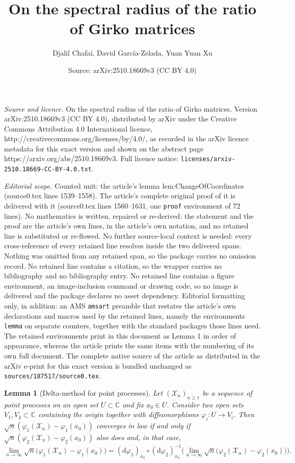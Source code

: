 \documentclass[10pt,a4paper]{amsart}
\title{On the spectral radius of the ratio of Girko matrices}
\author{Djalil Chafaï, David García-Zelada, Yuan Yuan Xu}
\date{Source: arXiv:2510.18669v3 (CC BY 4.0)}
\newtheorem{lemma}{Lemma}
\begin{document}
\maketitle

\noindent\emph{Source and licence.} On the spectral radius of the ratio of Girko matrices. Version arXiv:2510.18669v3 (CC BY 4.0), distributed by arXiv under the Creative Commons Attribution 4.0 International licence, http://creativecommons.org/licenses/by/4.0/, as recorded in the arXiv licence metadata for this exact version and shown on the abstract page https://arxiv.org/abs/2510.18669v3. Full licence notice: \texttt{licenses/arxiv-2510.18669-CC-BY-4.0.txt}.\par\smallskip

\noindent\textit{Editorial scope.} Counted unit: the article's lemma lem:ChangeOfCoordinates (source0.tex lines 1539--1558). The article's complete original proof of it is delivered with it (source0.tex lines 1560--1631, one \texttt{proof} environment of 72 lines). No mathematics is written, repaired or re-derived: the statement and the proof are the article's own lines, in the article's own notation, and no retained line is substituted or re-flowed.  No further source-local context is needed: every cross-reference of every retained line resolves inside the two delivered spans.  Nothing was omitted from any retained span, so the package carries no omission record.  No retained line contains a citation, so the wrapper carries no bibliography and no bibliography entry.  No retained line contains a figure environment, an image-inclusion command or drawing code, so no image is delivered and the package declares no asset dependency.  Editorial formatting only, in addition: an AMS \texttt{amsart} preamble that restates the article's own declarations and macros used by the retained lines, namely the environments \texttt{lemma} on separate counters, together with the standard packages those lines need.  The retained environments print in this document as Lemma 1 in order of appearance, whereas the article prints the same items with the numbering of its own full document.  The complete native source of the article as distributed in the arXiv e-print for this exact version is bundled unchanged as \texttt{sources/187517/source0.tex}.
\begin{lemma}[Delta-method for point processes] \label{lem:ChangeOfCoordinates}
Let $(\mathcal X_n)_{n \geq 1}$ be a sequence
of point processes on an open set 
$U \subset \mathbb C$ and fix $x_0 \in U$. Consider two open sets $V_1,V_2 \subset \mathbb C$
containing the origin 
together with diffeomorphisms
$\varphi_i: U \to V_i$.
 Then
$\sqrt n (\varphi_1(\mathcal X_n) - 
\varphi_1(x_0))$
converges in law if and only if $\sqrt n (\varphi_2(\mathcal X_n) - \varphi_2(x_0))$
also does and, in that case,
\[\lim_{n \to \infty}
\sqrt n \big(\varphi_1(\mathcal X_n) - \varphi_1(x_0) \big)
=
(\mathrm d \varphi_1)_{x_0} \circ
(\mathrm d \varphi_2)_{x_0}^{-1}
\Big(\lim_{n \to \infty}
\sqrt n \big(\varphi_2(\mathcal X_n) - \varphi_2(x_0)\big)\Big).\]
\end{lemma}
\end{document}
